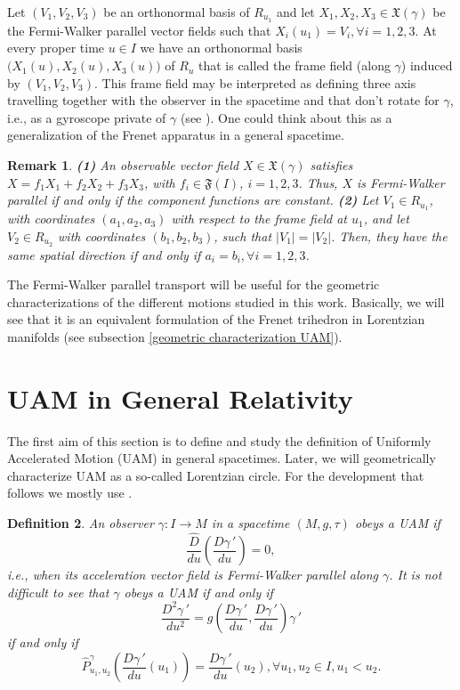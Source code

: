 \documentclass[11pt]{book}
\newtheorem{defi}{Definition}[chapter]
\newtheorem{rem}[defi]{Remark}
\def\F{\mathfrak F}
\def\x{\mathfrak X}
\begin{document}
Let $(V_1,V_2,V_3)$ be an orthonormal basis of $R_{u_1}$ and let $X_1,X_2,X_3\in \x(\gamma)$ be the Fermi-Walker parallel vector fields such that $X_i(u_1)=V_i,\forall i=1,2,3$. At every proper time $u\in I$ we have an orthonormal basis $\big(X_1(u),X_2(u),X_3(u)\big)$ of $R_u$ that is called the frame field (along $\gamma$) induced by $(V_1,V_2,V_3)$. This frame field may be interpreted as defining three axis travelling together with the observer in the spacetime and that don't rotate for $\gamma$, i.e., as a gyroscope private of $\gamma$ (see \cite[Chapter 3]{SRG}). One could think about this as a generalization of the Frenet apparatus in a general spacetime.


\begin{rem}
	{\rm
		{\bf (1)} An observable vector field $X\in \x(\gamma)$ satisfies $X=f_1 X_1+f_2 X_2+f_3 X_3$, with $f_i\in \F(I)$, $i=1,2,3$. Thus, $X$ is Fermi-Walker parallel if and only if the component functions are constant.
		{\bf (2)} Let $V_1\in R_{u_1}$, with coordinates $(a_1,a_2,a_3)$ with respect to the frame field at $u_1$, and let $V_2\in R_{u_2}$ with coordinates $(b_1,b_2,b_3)$, such that $|V_1|=|V_2|$. Then, they have the same spatial direction if and only if $a_i=b_i, \forall i=1,2,3$.
	}
\end{rem}

The Fermi-Walker parallel transport will be useful for the geometric characterizations of the different motions studied in this work. Basically, we will see that it is an equivalent formulation of the Frenet trihedron in Lorentzian manifolds (see subsection \ref{geometric characterization UAM}).

\section{UAM in General Relativity}\label{UAM in General Relativity}
The first aim of this section is to define and study the definition of Uniformly Accelerated Motion (UAM) in general spacetimes. Later, we will geometrically characterize UAM as a so-called Lorentzian circle. For the development that follows we mostly use \cite{UAM}.

\begin{defi}
	An observer $\gamma:I\to M$ in a spacetime $(M,g,\tau)$ obeys a UAM if 
	\begin{equation}
		\frac{\widehat{D}}{du}\left( \frac{D\gamma{\,'}}{du} \right)=0,
	\end{equation}
	i.e., when its acceleration vector field is Fermi-Walker parallel along $\gamma$. It is not difficult to see that
	$\gamma$ obeys a UAM if and only if 
	\begin{equation}\label{MUA}
		\dfrac{D^2\gamma{\,'}}{du^2}=g\left( \dfrac{D\gamma{\,'}}{du},\dfrac{D\gamma{\,'}}{du}\right)\gamma{\,'}
	\end{equation}
	if and only if  
	\begin{equation}
		\widehat{P}_{u_1,u_2}^\gamma\left(\dfrac{D\gamma{\,'}}{du}(u_1)\right)=\dfrac{D\gamma{\,'}}{du}(u_2),\forall u_1,u_2\in I, u_1<u_2.
	\end{equation}
\end{defi}
\end{document}
